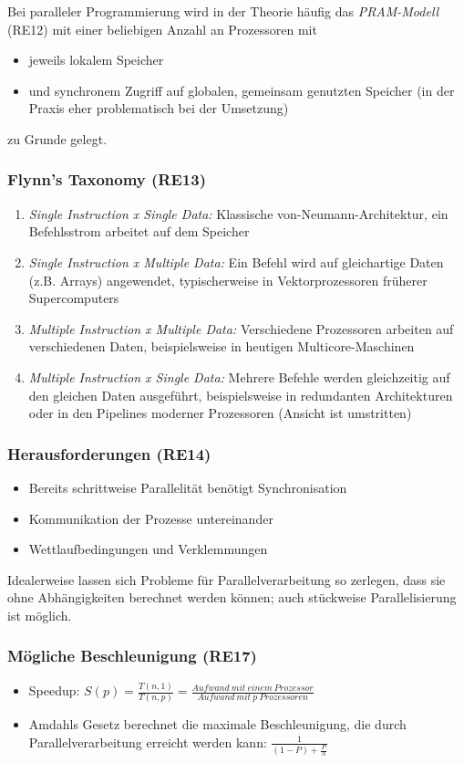 Bei paralleler Programmierung wird in der Theorie häufig das \textit{PRAM-Modell} (RE12) mit einer beliebigen Anzahl an Prozessoren mit
\begin{itemize}
	\item jeweils lokalem Speicher
	\item und synchronem Zugriff auf globalen, gemeinsam genutzten Speicher (in der Praxis eher problematisch bei der Umsetzung)
\end{itemize}
zu Grunde gelegt.

\subsubsection{Flynn's Taxonomy (RE13)}
\begin{enumerate}
	\item \textit{Single Instruction x Single Data:} Klassische von-Neumann-Architektur, ein Befehlsstrom arbeitet auf dem Speicher
	\item \textit{Single Instruction x Multiple Data:} Ein Befehl wird auf gleichartige Daten (z.B. Arrays) angewendet, typischerweise in Vektorprozessoren früherer Supercomputers
	\item \textit{Multiple Instruction x Multiple Data:} Verschiedene Prozessoren arbeiten auf verschiedenen Daten, beispielsweise in heutigen Multicore-Maschinen
	\item \textit{Multiple Instruction x Single Data:} Mehrere Befehle werden gleichzeitig auf den gleichen Daten ausgeführt, beispielsweise in redundanten Architekturen oder in den Pipelines moderner Prozessoren (Ansicht ist umstritten)
\end{enumerate}

\subsubsection{Herausforderungen (RE14)}
\begin{itemize}
	\item Bereits schrittweise Parallelität benötigt Synchronisation
	\item Kommunikation der Prozesse untereinander
	\item Wettlaufbedingungen und Verklemmungen
\end{itemize}
Idealerweise lassen sich Probleme für Parallelverarbeitung so zerlegen, dass sie ohne Abhängigkeiten berechnet werden können; auch stückweise Parallelisierung ist möglich.

\subsubsection{Mögliche Beschleunigung (RE17)}
\begin{itemize}
	\item Speedup: \(S(p) = \frac{T(n,1)}{T(n,p)} = \frac{Aufwand~mit~einem~Prozessor}{Aufwand~mit~p~Prozessoren}\)
	\item Amdahls Gesetz berechnet die maximale Beschleunigung, die durch Parallelverarbeitung erreicht werden kann: \(\frac{1}{(1-P)+\frac{P}{N}}\)
\end{itemize}


